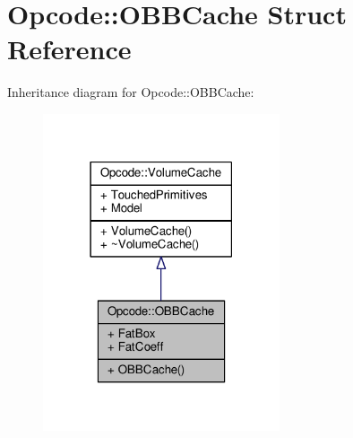 \hypertarget{structOpcode_1_1OBBCache}{}\section{Opcode\+:\+:O\+B\+B\+Cache Struct Reference}
\label{structOpcode_1_1OBBCache}


Inheritance diagram for Opcode\+:\+:O\+B\+B\+Cache\+:
\nopagebreak
\begin{figure}[H]
\begin{center}
\leavevmode
\includegraphics[width=198pt]{de/de9/structOpcode_1_1OBBCache__inherit__graph}
\end{center}
\end{figure}


